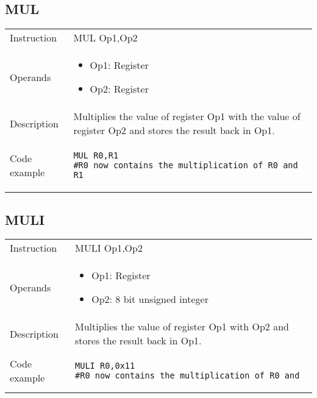 \subsection{MUL}
\renewcommand*{\arraystretch}{2.0}
\begin{longtable}{P{3cm}P{9cm}}
\midrule
\noindent Instruction & MUL Op1,Op2 \\
\noindent Operands &
\begin{itemize}[label={},noitemsep,leftmargin=*,topsep=0pt,partopsep=0pt, itemsep=1em]
\item Op1: Register
\item Op2: Register
\end{itemize}\\
\noindent Description & Multiplies the value of register Op1 with the value of register Op2 and stores the result back in Op1.
	 \\
\noindent Code example & 
\begin{lstlisting}
MUL R0,R1
#R0 now contains the multiplication of R0 and R1
\end{lstlisting} \\
\end{longtable}


\subsection{MULI}
\renewcommand*{\arraystretch}{2.0}
\begin{longtable}{P{3cm}P{9cm}}
\midrule
\noindent Instruction & MULI Op1,Op2 \\
\noindent Operands &
\begin{itemize}[label={},noitemsep,leftmargin=*,topsep=0pt,partopsep=0pt, itemsep=1em]
\item Op1: Register
\item Op2: 8 bit unsigned integer
\end{itemize}\\
\noindent Description & Multiplies the value of register Op1 with Op2 and stores the result back in Op1.
	 \\
\noindent Code example & 
\begin{lstlisting}
MULI R0,0x11
#R0 now contains the multiplication of R0 and
\end{lstlisting} \\
\end{longtable}

\newpage

